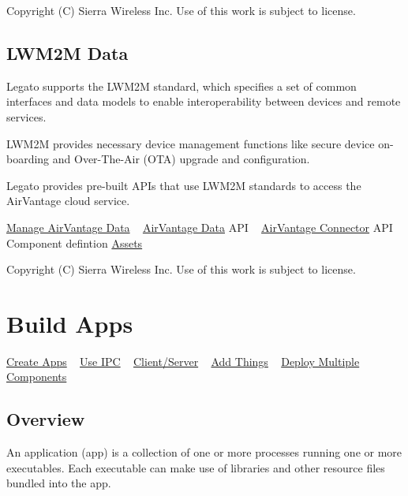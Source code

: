 Copyright (C) Sierra Wireless Inc. Use of this work is subject to license. \hypertarget{basicLWM2MData}{}\subsection{L\+W\+M2\+M Data}\label{basicLWM2MData}
Legato supports the L\+W\+M2\+M standard, which specifies a set of common interfaces and data models to enable interoperability between devices and remote services.

L\+W\+M2\+M provides necessary device management functions like secure device on-\/boarding and Over-\/\+The-\/\+Air (O\+T\+A) upgrade and configuration.

Legato provides pre-\/built A\+P\+Is that use L\+W\+M2\+M standards to access the Air\+Vantage cloud service.

\hyperlink{howToAVData}{Manage Air\+Vantage Data} ~\newline
 \hyperlink{c_le_avdata}{Air\+Vantage Data} A\+P\+I ~\newline
 \hyperlink{c_le_avc}{Air\+Vantage Connector} A\+P\+I ~\newline
 Component defintion \hyperlink{def_files_cdef_defFilesCdef_assets}{Assets}





Copyright (C) Sierra Wireless Inc. Use of this work is subject to license. \hypertarget{basicApps}{}\section{Build Apps}\label{basicApps}
\hyperlink{basicAppsCreate}{Create Apps} ~\newline
 \hyperlink{basicAppsIPC}{Use I\+P\+C} ~\newline
 \hyperlink{basicAppsClientServer}{Client/\+Server} ~\newline
 \hyperlink{basicAppsAddThings}{Add Things} ~\newline
 \hyperlink{basicAppsCompMulti}{Deploy Multiple Components}\hypertarget{basic_apps_basicAppsCreate_overview}{}\subsection{Overview}\label{basic_apps_basicAppsCreate_overview}
An application (app) is a collection of one or more processes running one or more executables. Each executable can make use of libraries and other resource files bundled into the app.

